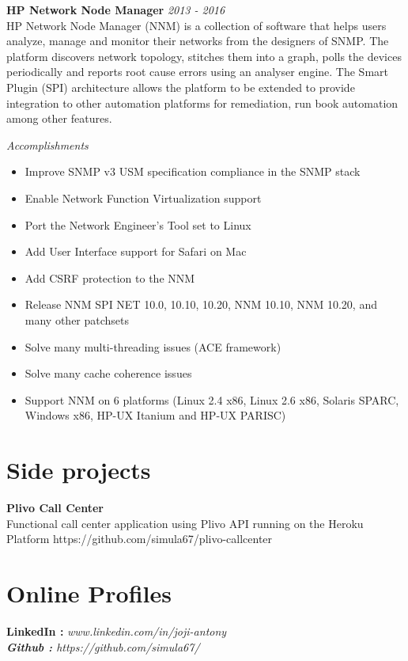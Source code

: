 \documentclass[line,margin]{res}
\begin{document}
\begin{resume}
{\bf HP Network Node Manager} \hfill {\it{2013 - 2016}}\\

HP Network Node Manager (NNM) is a collection of software that helps users analyze, manage and monitor their networks from the designers of SNMP. The platform discovers network topology, stitches them into a graph, polls the devices periodically and reports root cause errors using an analyser engine. The Smart Plugin (SPI) architecture allows the platform to be extended to provide integration to other automation platforms for remediation, run book automation among other features.

{\it{Accomplishments}}\\
\begin{itemize}
\item Improve SNMP v3 USM specification compliance in the SNMP stack
\item Enable Network Function Virtualization support
\item Port the Network Engineer's Tool set to Linux
\item Add User Interface support for Safari on Mac
\item Add CSRF protection to the NNM
\item Release NNM SPI NET 10.0, 10.10, 10.20, NNM 10.10, NNM 10.20, and many other patchsets
\item Solve many multi-threading issues (ACE framework)
\item Solve many cache coherence issues
\item Support NNM on 6 platforms (Linux 2.4 x86, Linux 2.6 x86, Solaris SPARC, Windows x86, HP-UX Itanium and HP-UX PARISC)
\end{itemize}


\section{Side projects}
{\bf Plivo Call Center}\\
Functional call center application using Plivo API running on the Heroku Platform
https://github.com/simula67/plivo-callcenter

\section{Online Profiles}
{\bf LinkedIn :} \it{www.linkedin.com/in/joji-antony} \\
{\bf Github :} \it{https://github.com/simula67/}

\end{resume}
\end{document}
